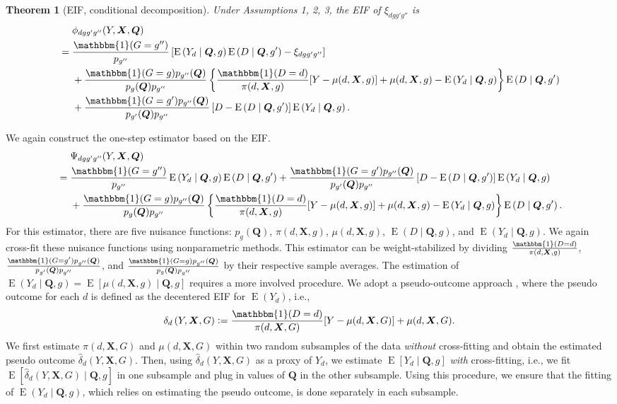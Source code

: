 \documentclass[12pt,a4paper]{article}
\newtheorem{prop}{Theorem}
\newcommand{\E}{\operatorname{E}}
\def\X{{\boldsymbol X}}
\def\Q{{\boldsymbol Q}}
\def\one{\mathbbm{1}}
\newcommand{\defeq}{\vcentcolon=}
\begin{document}
\begin{prop}[EIF, conditional decomposition]
Under Assumptions 1, 2, 3, the EIF of $\xi_{dgg'g''}$ is 
\begin{align*}
     &\phantom{{}={}} \phi_{dgg'g''}(Y,\X,\Q) \\
    &=\frac{\one(G=g'')}{p_{g''}} \left[ \E \left(Y_d \mid \Q, g \right) \E \left(D \mid \Q, g' \right) - \xi_{dgg'g''} \right] \\
    &\phantom{{}={}} + \frac{\one(G=g) p_{g''}(\Q)}{p_g(\Q)p_{g''}} \left\{ \frac{\one(D=d)}{\pi(d,\X,g)} [Y-\mu(d,\X,g)]+\mu(d,\X,g) - \E \left(Y_d \mid \Q,g \right) \right\} \E \left(D \mid \Q,g' \right) \\
    &\phantom{{}={}} + \frac{\one(G=g')p_{g''}(\Q)}{p_{g'}(\Q)p_{g''}} \left[ D-\E \left(D \mid \Q, g' \right) \right] \E\left( Y_d \mid \Q, g \right).
\end{align*}
\end{prop}
We again construct the one-step estimator based on the EIF. 
\begin{align*}
    &\phantom{{}={}} \Psi_{dgg'g''}(Y,\X,\Q) \\
    &=\frac{\one(G=g'')}{p_{g''}} \E \left(Y_d \mid \Q, g \right) \E \left(D \mid \Q, g' \right) + \frac{\one(G=g')p_{g''}(\Q)}{p_{g'}(\Q)p_{g''}} \left[ D-\E \left(D \mid \Q, g' \right) \right] \E\left( Y_d \mid \Q, g \right) \\
    &\phantom{{}={}} + \frac{\one(G=g) p_{g''}(\Q)}{p_g(\Q)p_{g''}} \left\{ \frac{\one(D=d)}{\pi(d,\X,g)} [Y-\mu(d,\X,g)]+\mu(d,\X,g) - \E \left(Y_d \mid \Q,g \right) \right\} \E \left(D \mid \Q,g' \right).
\end{align*}
For this estimator, there are five nuisance functions: $p_g(\Q)$, $\pi(d,\X,g)$, $\mu(d,\X,g)$, $\E(D \mid \Q, g)$, and $\E(Y_d \mid \Q,g)$. We again cross-fit these nuisance functions using nonparametric methods. This estimator can be weight-stabilized by dividing $\frac{\one(D=d)}{\pi(d,\X,g)}$, $\frac{\one(G=g')p_{g''}(\Q)}{p_{g'}(\Q)p_{g''}}$, and $\frac{\one(G=g)p_{g''}(\Q)}{p_g(\Q)p_{g''}}$ by their respective sample averages. The estimation of $\E(Y_d \mid \Q,g)=\E[\mu(d,\X,g) \mid \Q,g]$ requires a more involved procedure. We adopt a pseudo-outcome approach \citep[e.g.,][]{van_der_laan_statistical_2006,semenova_debiased_2021}, where the pseudo outcome for each $d$ is defined as the decentered EIF for $\E(Y_d)$, i.e., 
$$ \delta_d \left(Y, \X,  G \right) \defeq \frac{\one(D=d)}{\pi(d, \X,G)} [Y-\mu(d,\X,G)] + \mu(d,\X,G).$$
We first estimate $\pi(d, \X,G)$ and $\mu(d,\X,G)$ within two random subsamples of the data \emph{without} cross-fitting and obtain the estimated pseudo outcome $\hat{\delta}_d \left(Y, \X,  G \right)$. Then, using $\hat{\delta}_d \left(Y, \X,  G \right)$ as a proxy of $Y_d$, we estimate $\E\left[Y_d \mid \Q, g \right]$ \emph{with} cross-fitting, i.e., we fit $\E\left[\hat{\delta}_d \left(Y, \X,  G \right) \mid \Q, g \right]$ in one subsample and plug in values of $\Q$ in the other subsample. Using this procedure, we ensure that the fitting of $\E(Y_d \mid \Q,g)$, which relies on estimating the pseudo outcome, is done separately in each subsample. 
\end{document}
